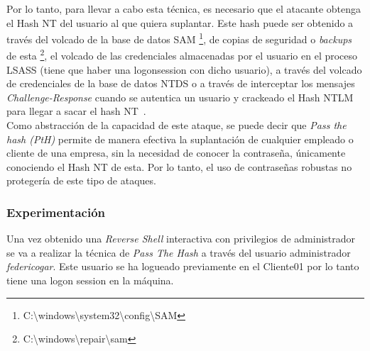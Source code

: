 Por lo tanto, para llevar a cabo esta técnica, es necesario que el atacante obtenga el Hash NT del usuario al que quiera suplantar. Este hash puede ser obtenido a través del volcado de la base de datos SAM \footnote{C:\textbackslash{}windows\textbackslash{}system32\textbackslash{}config\textbackslash{}SAM}, de copias de seguridad o {\it backups} de esta \footnote{C:\textbackslash{}windows\textbackslash{}repair\textbackslash{}sam}, el volcado de las credenciales almacenadas por el usuario en el proceso LSASS (tiene que haber una logonsession con dicho usuario), a través del volcado de credenciales de la base de datos NTDS  o a través de interceptar los mensajes {\it Challenge-Response} cuando se autentica un usuario y crackeado el Hash NTLM para llegar a sacar el hash NT~\cite{Capitulo5:PtH}. \\

Como abstracción de la capacidad de este ataque, se puede decir que {\it Pass the hash (PtH)} permite de manera efectiva la suplantación de cualquier empleado o cliente de una empresa, sin la necesidad de conocer la contraseña, únicamente conociendo el Hash NT de esta. Por lo tanto, el uso de contraseñas robustas no protegería de este tipo de ataques. \\

\subsubsection{Experimentación}

Una vez obtenido una {\it Reverse Shell} interactiva con privilegios de administrador se va a realizar la técnica de {\it Pass The Hash} a través del usuario administrador {\it federicogar}. Este usuario se ha logueado previamente en el Cliente01 por lo tanto tiene una logon session en la máquina. 

